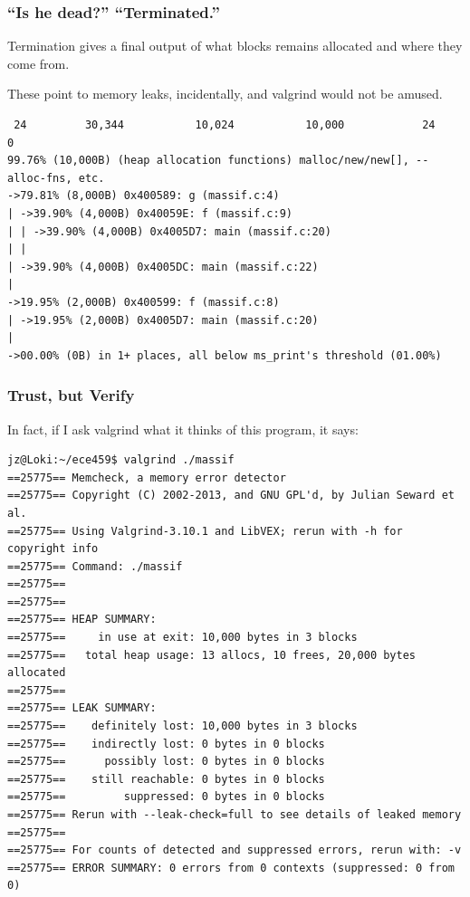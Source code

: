 \begin{frame}[fragile]
\frametitle{``Is he dead?'' ``Terminated.''}

Termination gives a final output of what blocks remains allocated and where they come from. 

These point to memory leaks, incidentally, and valgrind would not be amused.

{\scriptsize
\begin{verbatim}
 24         30,344           10,024           10,000            24            0
99.76% (10,000B) (heap allocation functions) malloc/new/new[], --alloc-fns, etc.
->79.81% (8,000B) 0x400589: g (massif.c:4)
| ->39.90% (4,000B) 0x40059E: f (massif.c:9)
| | ->39.90% (4,000B) 0x4005D7: main (massif.c:20)
| |   
| ->39.90% (4,000B) 0x4005DC: main (massif.c:22)
|   
->19.95% (2,000B) 0x400599: f (massif.c:8)
| ->19.95% (2,000B) 0x4005D7: main (massif.c:20)
|   
->00.00% (0B) in 1+ places, all below ms_print's threshold (01.00%)
\end{verbatim}
}


\end{frame}


\begin{frame}[fragile]
\frametitle{Trust, but Verify}

In fact, if I ask valgrind what it thinks of this program, it says:

{\scriptsize
\begin{verbatim}
jz@Loki:~/ece459$ valgrind ./massif
==25775== Memcheck, a memory error detector
==25775== Copyright (C) 2002-2013, and GNU GPL'd, by Julian Seward et al.
==25775== Using Valgrind-3.10.1 and LibVEX; rerun with -h for copyright info
==25775== Command: ./massif
==25775== 
==25775== 
==25775== HEAP SUMMARY:
==25775==     in use at exit: 10,000 bytes in 3 blocks
==25775==   total heap usage: 13 allocs, 10 frees, 20,000 bytes allocated
==25775== 
==25775== LEAK SUMMARY:
==25775==    definitely lost: 10,000 bytes in 3 blocks
==25775==    indirectly lost: 0 bytes in 0 blocks
==25775==      possibly lost: 0 bytes in 0 blocks
==25775==    still reachable: 0 bytes in 0 blocks
==25775==         suppressed: 0 bytes in 0 blocks
==25775== Rerun with --leak-check=full to see details of leaked memory
==25775== 
==25775== For counts of detected and suppressed errors, rerun with: -v
==25775== ERROR SUMMARY: 0 errors from 0 contexts (suppressed: 0 from 0)
\end{verbatim}
}


\end{frame}


